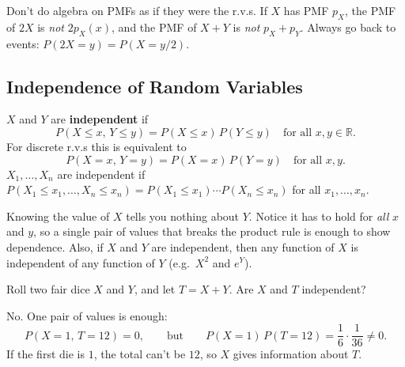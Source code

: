 \bigskip

\begin{pitfall}
Don't do algebra on PMFs as if they were the r.v.s. If $X$ has PMF $p_X$, the PMF of $2X$ is \emph{not} $2p_X(x)$, and the PMF of $X + Y$ is \emph{not} $p_X + p_Y$. Always go back to events: $P(2X = y) = P(X = y/2)$.
\end{pitfall}

\bigskip

\subsection{Independence of Random Variables}

\bigskip

\begin{definition}[Independence of r.v.s]\label{def:indeprv}
$X$ and $Y$ are \textbf{independent} if
\medskip
\[
P(X \le x,\, Y \le y) = P(X \le x)\,P(Y \le y) \quad \text{for all } x, y \in \mathbb{R}.
\]
\medskip
For discrete r.v.s this is equivalent to
\medskip
\[
P(X = x,\, Y = y) = P(X = x)\,P(Y = y) \quad \text{for all } x, y.
\]
\medskip
$X_1, \dots, X_n$ are independent if $P(X_1 \le x_1, \dots, X_n \le x_n) = P(X_1 \le x_1) \cdots P(X_n \le x_n)$ for all $x_1, \dots, x_n$.
\end{definition}

\bigskip

\begin{intuition}
Knowing the value of $X$ tells you nothing about $Y$. Notice it has to hold for \emph{all} $x$ and $y$, so a single pair of values that breaks the product rule is enough to show dependence. Also, if $X$ and $Y$ are independent, then any function of $X$ is independent of any function of $Y$ (e.g.\ $X^{2}$ and $e^{Y}$).
\end{intuition}

\bigskip

\begin{example}
Roll two fair dice $X$ and $Y$, and let $T = X + Y$. Are $X$ and $T$ independent?
\end{example}

\medskip

\begin{solution}
No. One pair of values is enough:
\medskip
\[
P(X = 1,\, T = 12) = 0,
\qquad \text{but} \qquad
P(X = 1)\,P(T = 12) = \frac{1}{6} \cdot \frac{1}{36} \neq 0.
\]
\medskip
If the first die is $1$, the total can't be $12$, so $X$ gives information about $T$.
\end{solution}

